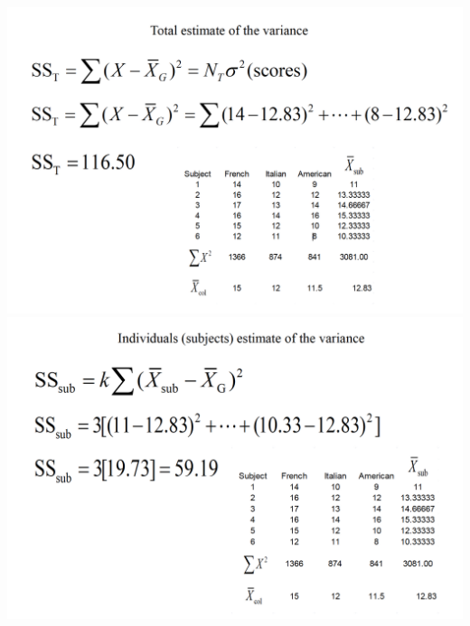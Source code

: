 \documentclass[]{book}
\theoremstyle{definition}
\theoremstyle{definition}
\theoremstyle{definition}
\theoremstyle{remark}
\begin{document}
\includegraphics{img/hicksrma7.png} \includegraphics{img/hicksrma8.png}
\end{document}
